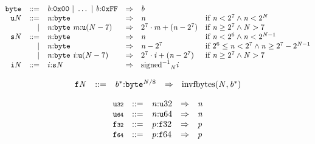 \vspace{1ex}

\vspace{1ex}

$$
\begin{array}{@{}l@{}rrlll@{}l@{}}
& {\mathtt{byte}} &::=& {\mathit{b}}{:}\mathtt{0x00} ~|~ \dots ~|~ {\mathit{b}}{:}\mathtt{0xFF} &\Rightarrow& {\mathit{b}} \\
& {{\mathtt{u}}}{{\mathit{N}}} &::=& {\mathit{n}}{:}{\mathtt{byte}} &\Rightarrow& {\mathit{n}} &\quad
  \mbox{if}~{\mathit{n}} < {2^{7}} \land {\mathit{n}} < {2^{{\mathit{N}}}} \\ &&|&
{\mathit{n}}{:}{\mathtt{byte}}~{\mathit{m}}{:}{{\mathtt{u}}}{({\mathit{N}} - 7)} &\Rightarrow& {2^{7}} \cdot {\mathit{m}} + ({\mathit{n}} - {2^{7}}) &\quad
  \mbox{if}~{\mathit{n}} \geq {2^{7}} \land {\mathit{N}} > 7 \\
& {{\mathtt{s}}}{{\mathit{N}}} &::=& {\mathit{n}}{:}{\mathtt{byte}} &\Rightarrow& {\mathit{n}} &\quad
  \mbox{if}~{\mathit{n}} < {2^{6}} \land {\mathit{n}} < {2^{{\mathit{N}} - 1}} \\ &&|&
{\mathit{n}}{:}{\mathtt{byte}} &\Rightarrow& {\mathit{n}} - {2^{7}} &\quad
  \mbox{if}~{2^{6}} \leq {\mathit{n}} < {2^{7}} \land {\mathit{n}} \geq {2^{7}} - {2^{{\mathit{N}} - 1}} \\ &&|&
{\mathit{n}}{:}{\mathtt{byte}}~{\mathit{i}}{:}{{\mathtt{u}}}{({\mathit{N}} - 7)} &\Rightarrow& {2^{7}} \cdot {\mathit{i}} + ({\mathit{n}} - {2^{7}}) &\quad
  \mbox{if}~{\mathit{n}} \geq {2^{7}} \land {\mathit{N}} > 7 \\
& {{\mathtt{i}}}{{\mathit{N}}} &::=& {\mathit{i}}{:}{{\mathtt{s}}}{{\mathit{N}}} &\Rightarrow& {{{{{\mathrm{signed}}^{{-1}}}}{}}_{{\mathit{N}}}}{{\mathit{i}}} \\
\end{array}
$$

\vspace{1ex}

$$
\begin{array}{@{}l@{}rrlll@{}l@{}}
& {{\mathtt{f}}}{{\mathit{N}}} &::=& {{\mathit{b}}^\ast}{:}{{\mathtt{byte}}^{{\mathit{N}} / 8}} &\Rightarrow& {\mathrm{invfbytes}}({\mathit{N}}, {{\mathit{b}}^\ast}) \\
\end{array}
$$

\vspace{1ex}

$$
\begin{array}{@{}l@{}rrlll@{}l@{}}
& {\mathtt{u{\scriptstyle32}}} &::=& {\mathit{n}}{:}{{\mathtt{u}}}{32} &\Rightarrow& {\mathit{n}} \\
& {\mathtt{u{\scriptstyle64}}} &::=& {\mathit{n}}{:}{{\mathtt{u}}}{64} &\Rightarrow& {\mathit{n}} \\
& {\mathtt{f{\scriptstyle32}}} &::=& {\mathit{p}}{:}{{\mathtt{f}}}{32} &\Rightarrow& {\mathit{p}} \\
& {\mathtt{f{\scriptstyle64}}} &::=& {\mathit{p}}{:}{{\mathtt{f}}}{64} &\Rightarrow& {\mathit{p}} \\
\end{array}
$$

